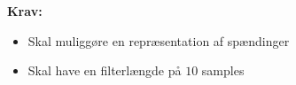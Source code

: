 \vspace{3mm}
\textbf{Krav:}
\begin{itemize}
\item Skal muliggøre en repræsentation af spændinger 
\item Skal have en filterlængde på $10$ samples
\end{itemize}